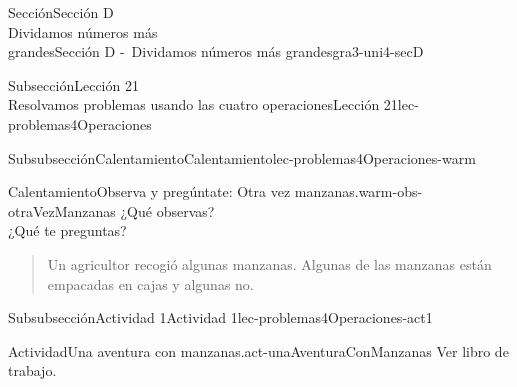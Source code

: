 \begin{sectionptx}{Sección}{{\Large Sección D\\}Dividamos números más\\grandes}{}{Sección D -~Dividamos números más grandes}{}{}{gra3-uni4-secD}
\begin{subsectionptx}{Subsección}{{\normalsize Lección 21\\[-0.05cm]}Resolvamos problemas usando las cuatro operaciones}{}{Lección 21}{}{}{lec-problemas4Operaciones}
%
\begin{subsubsectionptx}{Subsubsección}{Calentamiento}{}{Calentamiento}{}{}{lec-problemas4Operaciones-warm}
\begin{exploration}{Calentamiento}{Observa y pregúntate: Otra vez manzanas.}{warm-obs-otraVezManzanas}%
¿Qué observas?\\
 ¿Qué te preguntas?%
\begin{quote}%
Un agricultor recogió algunas manzanas. Algunas de las manzanas están empacadas en cajas y algunas no.%
\end{quote}
\end{exploration}%
\end{subsubsectionptx}
%
%
\typeout{************************************************}
\typeout{************************************************}
%
\begin{subsubsectionptx}{Subsubsección}{Actividad 1}{}{Actividad 1}{}{}{lec-problemas4Operaciones-act1}
\begin{activity}{Actividad}{Una aventura con manzanas.}{act-unaAventuraConManzanas}%
Ver libro de trabajo.
\end{activity}%
\end{subsubsectionptx}
%
%
\typeout{************************************************}
\typeout{************************************************}

\end{subsectionptx}
\end{sectionptx}
